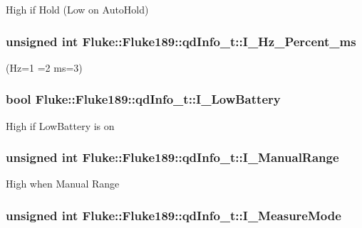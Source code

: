 \label{structFluke_1_1Fluke189_1_1qdInfo__t_af6144c8481ee484c798ea68a5c290689}
High if Hold (Low on AutoHold) \hypertarget{structFluke_1_1Fluke189_1_1qdInfo__t_a3e563ee447402d71b5ad1f6da7c1f876}{
\subsubsection[{I\_\-Hz\_\-Percent\_\-ms}]{\setlength{\rightskip}{0pt plus 5cm}unsigned int {\bf Fluke::Fluke189::qdInfo\_\-t::I\_\-Hz\_\-Percent\_\-ms}}}
\label{structFluke_1_1Fluke189_1_1qdInfo__t_a3e563ee447402d71b5ad1f6da7c1f876}
(Hz=1 =2 ms=3) \hypertarget{structFluke_1_1Fluke189_1_1qdInfo__t_a0d828ad92ec35af5c4114699af266960}{
\subsubsection[{I\_\-LowBattery}]{\setlength{\rightskip}{0pt plus 5cm}bool {\bf Fluke::Fluke189::qdInfo\_\-t::I\_\-LowBattery}}}
\label{structFluke_1_1Fluke189_1_1qdInfo__t_a0d828ad92ec35af5c4114699af266960}
High if LowBattery is on \hypertarget{structFluke_1_1Fluke189_1_1qdInfo__t_ac7769eec0ce6e6ec1eaf88c1736e51c0}{
\subsubsection[{I\_\-ManualRange}]{\setlength{\rightskip}{0pt plus 5cm}unsigned int {\bf Fluke::Fluke189::qdInfo\_\-t::I\_\-ManualRange}}}
\label{structFluke_1_1Fluke189_1_1qdInfo__t_ac7769eec0ce6e6ec1eaf88c1736e51c0}
High when Manual Range \hypertarget{structFluke_1_1Fluke189_1_1qdInfo__t_a9ecea1a82c8e2cd052fd255bebbc6242}{
\subsubsection[{I\_\-MeasureMode}]{\setlength{\rightskip}{0pt plus 5cm}unsigned int {\bf Fluke::Fluke189::qdInfo\_\-t::I\_\-MeasureMode}}}

